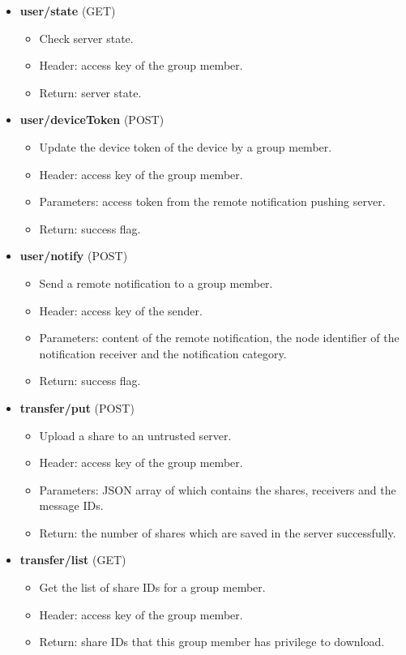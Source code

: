 \documentclass[a4paper,11pt]{report}
\begin{document}
\begin{itemize}[leftmargin=7mm]
	\item 
	\textbf{user/state} (GET)
	\begin{itemize}
		\item Check server state.
		\item Header: access key of the group member.
		\item Return: server state.
	\end{itemize}
	\item 
	\textbf{user/deviceToken} (POST)
	\begin{itemize}
		\item Update the device token of the device by a group member.
		\item Header: access key of the group member.
		\item Parameters: access token from the remote notification pushing server.
		\item Return: success flag.
	\end{itemize}
	\item 
	\textbf{user/notify} (POST)
	\begin{itemize}
		\item Send a remote notification to a group member.
		\item Header: access key of the sender.
		\item Parameters: content of the remote notification, the node identifier of the notification receiver and the notification category.
		\item Return: success flag.
	\end{itemize}
	\item 
	\textbf{transfer/put} (POST)
	\begin{itemize}
		\item Upload a share to an untrusted server.
		\item Header: access key of the group member.
		\item Parameters: JSON array of which contains the shares, receivers and the message IDs.
		\item Return: the number of shares which are saved in the server successfully.
	\end{itemize}
	\item 
	\textbf{transfer/list} (GET)
	\begin{itemize}
		\item Get the list of share IDs for a group member.
		\item Header: access key of the group member.
		\item Return: share IDs that this group member has privilege to download.

\end{itemize}
\end{itemize}
\end{document}
